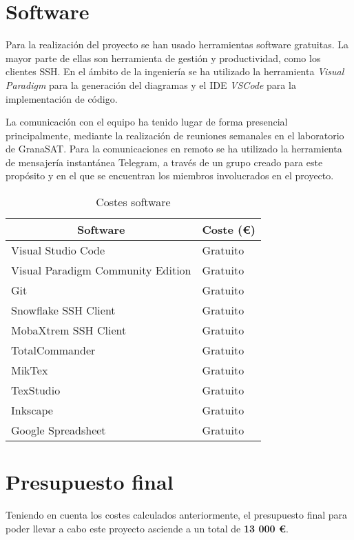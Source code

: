 \section{Software}

Para la realización del proyecto se han usado herramientas software gratuitas. La mayor parte de ellas son herramienta de gestión y productividad, como los clientes SSH. En el ámbito de la ingeniería se ha utilizado la herramienta \textit{Visual Paradigm} para la generación del diagramas y el IDE \textit{VSCode} para la implementación de código.

La comunicación con el equipo ha tenido lugar de forma presencial principalmente, mediante la realización de reuniones semanales en el laboratorio de GranaSAT. Para la comunicaciones en remoto se ha utilizado la herramienta de mensajería instantánea Telegram, a través de un grupo creado para este propósito y en el que se encuentran los miembros involucrados en el proyecto.

\begin{table}[h]
\centering
\begin{tabular}{ll}
\hline
\multicolumn{1}{c}{\textbf{Software}} & \multicolumn{1}{c}{\textbf{Coste (€)}} \\ \hline
Visual Studio Code                    & Gratuito                               \\
Visual Paradigm Community Edition     & Gratuito                               \\
Git                                   & Gratuito                               \\
Snowflake SSH Client                  & Gratuito                               \\
MobaXtrem SSH Client                  & Gratuito                               \\
TotalCommander                        & Gratuito                               \\
MikTex                                & Gratuito                               \\
TexStudio                             & Gratuito                               \\
Inkscape                              & Gratuito                               \\
Google Spreadsheet                    & Gratuito                               \\ \hline
\end{tabular}%
\caption{Costes software}
\label{tab:presupuesto-software}
\end{table}

\section{Presupuesto final}

Teniendo en cuenta los costes calculados anteriormente, el presupuesto final para poder llevar a cabo este proyecto asciende a un total de \textbf{13 000 €}.